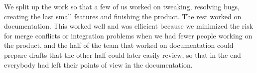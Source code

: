 We split up the work so that a few of us worked on tweaking, resolving bugs,
creating the last small features and finishing the product. The rest worked on
documentation. This worked well and was efficient because we minimized the risk
for merge conflicts or integration problems when we had fewer people working on
the product, and the half of the team that worked on documentation could prepare
drafts that the other half could later easily review, so that in the end
everybody had left their points of view in the documentation.